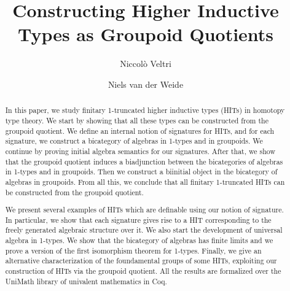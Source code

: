 \documentclass{lmcs}
\theoremstyle{plain}
\theoremstyle{definition}
\begin{document}
	
\lstset{language=Coq}

\title{Constructing Higher Inductive Types as Groupoid Quotients}


\author{Niccol{\`o} Veltri}
\address{Tallinn University of Technology, Estonia}

\author{Niels van der Weide}
\address{Radboud University, Nijmegen, The Netherlands}

\begin{abstract}
  In this paper, we study finitary 1-truncated higher inductive types (HITs) in homotopy type theory.
  We start by showing that all these types can be constructed from the groupoid quotient.  
	We define an internal notion of signatures for HITs,
	and for each signature, we construct a bicategory of algebras in 1-types and in groupoids.
	We continue by proving initial algebra semantics for our signatures.
	After that, we show that the groupoid quotient induces a biadjunction between the bicategories of algebras in 1-types and in groupoids.
	Then we construct a biinitial object in the bicategory of algebras in groupoids.
	From all this, we conclude that all finitary 1-truncated HITs can be constructed from the groupoid quotient.
        
        We present several examples of HITs which are definable using our notion of signature.
        In particular, we show that each signature gives rise to a HIT corresponding to the freely generated algebraic structure over it.
        We also start the development of universal algebra in 1-types.
        We show that the bicategory of algebras has finite limits and we prove a version of the first isomorphism theorem for 1-types.
        Finally, we give an alternative characterization of the foundamental groups of some HITs, exploiting our construction of HITs via the groupoid quotient.
        All the results are formalized over the UniMath library of univalent mathematics in Coq.
\end{abstract}
\end{document}
